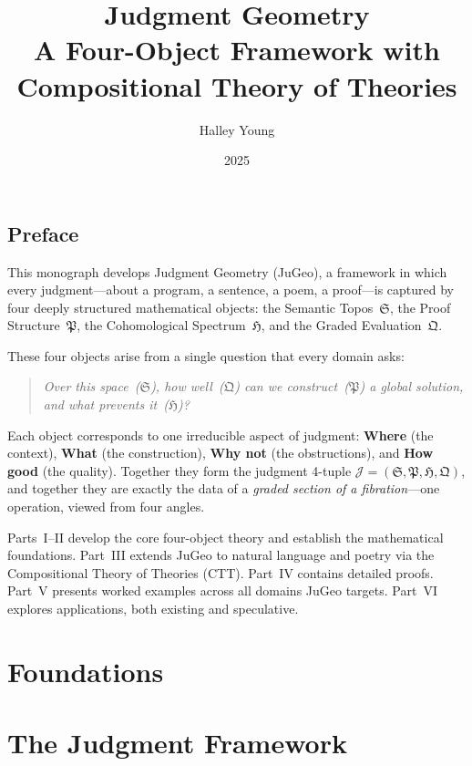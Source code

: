 \documentclass[12pt,openany]{book}
\title{\Huge\textbf{Judgment Geometry}\\[0.5em]
  \Large A Four-Object Framework with\\
  Compositional Theory of Theories}
\author{Halley Young}
\date{2025}
\theoremstyle{plain}
\theoremstyle{definition}
\theoremstyle{remark}
\newcommand{\STop}{\mathfrak{S}}     %
\newcommand{\PStr}{\mathfrak{P}}     %
\newcommand{\CSpec}{\mathfrak{H}}    %
\newcommand{\GEval}{\mathfrak{Q}}    %
\newcommand{\JJ}{\mathcal{J}}
\begin{document}
\frontmatter
\maketitle

\chapter*{Preface}

This monograph develops Judgment Geometry (JuGeo), a framework in
which every judgment---about a program, a sentence, a poem, a
proof---is captured by four deeply structured mathematical objects:
the Semantic Topos~$\STop$, the Proof Structure~$\PStr$, the
Cohomological Spectrum~$\CSpec$, and the Graded Evaluation~$\GEval$.

These four objects arise from a single question that every domain
asks:
\begin{quote}
  \emph{Over this space~($\STop$), how well~($\GEval$) can we
  construct~($\PStr$) a global solution, and what prevents
  it~($\CSpec$)?}
\end{quote}
\noindent Each object corresponds to one irreducible aspect of
judgment: \textbf{Where} (the context), \textbf{What} (the
construction), \textbf{Why not} (the obstructions), and
\textbf{How good} (the quality).  Together they form the judgment
4-tuple $\JJ = (\STop, \PStr, \CSpec, \GEval)$, and together they
are exactly the data of a \emph{graded section of a fibration}---one
operation, viewed from four angles.

Parts~I--II develop the core four-object theory and establish the
mathematical foundations.  Part~III extends JuGeo to natural
language and poetry via the Compositional Theory of Theories (CTT).
Part~IV contains detailed proofs.  Part~V presents worked examples
across all domains JuGeo targets.  Part~VI explores applications,
both existing and speculative.

\tableofcontents

\mainmatter

\part{Foundations}


\part{The Judgment Framework}

\end{document}
